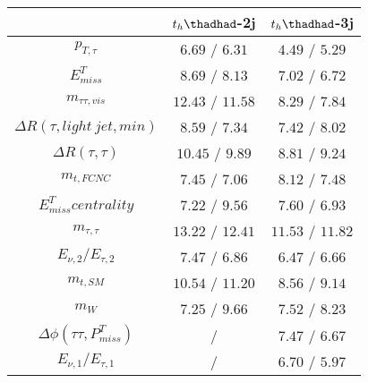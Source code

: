 \centering
\begin{tabular}{|c|c|c|} \hline
 & $t_h\thadhad$-2j & $t_h\thadhad$-3j\\\hline
$p_{T,\tau }$ & $6.69$ / $6.31$ & $4.49$ / $5.29$\\\hline
$E^{T}_{miss}$ & $8.69$ / $8.13$ & $7.02$ / $6.72$\\\hline
$m_{\tau \tau ,vis}$ & $12.43$ / $11.58$ & $8.29$ / $7.84$\\\hline
$\Delta R(\tau ,light~jet,min)$ & $8.59$ / $7.34$ & $7.42$ / $8.02$\\\hline
$\Delta R(\tau ,\tau )$ & $10.45$ / $9.89$ & $8.81$ / $9.24$\\\hline
$m_{t,FCNC}$ & $7.45$ / $7.06$ & $8.12$ / $7.48$\\\hline
$E^{T}_{miss} centrality$ & $7.22$ / $9.56$ & $7.60$ / $6.93$\\\hline
$m_{\tau ,\tau }$ & $13.22$ / $12.41$ & $11.53$ / $11.82$\\\hline
$E_{\nu,2}/E_{\tau ,2}$ & $7.47$ / $6.86$ & $6.47$ / $6.66$\\\hline
$m_{t,SM}$ & $10.54$ / $11.20$ & $8.56$ / $9.14$\\\hline
$m_{W}$ & $7.25$ / $9.66$ & $7.52$ / $8.23$\\\hline
$\Delta\phi(\tau \tau ,P^{T}_{miss})$ &  / & $7.47$ / $6.67$\\\hline
$E_{\nu,1}/E_{\tau ,1}$ &  / & $6.70$ / $5.97$\\\hline
\end{tabular}
